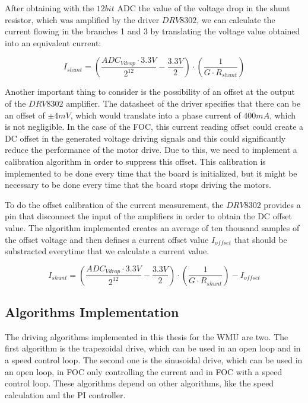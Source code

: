 After obtaining with the $12bit$ \ac{ADC} the value of the voltage drop in the shunt resistor, which was amplified by the driver $DRV8302$, we can calculate the current flowing in the branches 1 and 3 by translating the voltage value obtained into an equivalent current:

\begin{equation}
	I_{shunt} = (\frac{ ADC_{Vdrop} \cdot 3.3V }{ 2^{12} } - \frac{3.3V}{2}) \cdot (\frac{1}{G \cdot R_{shunt}})
\end{equation}

Another important thing to consider is the possibility of an offset at the output of the $DRV8302$ amplifier. The datasheet of the driver specifies that there can be an offset of $\pm 4mV$, which would translate into a phase current of $400mA$, which is not negligible. In the case of the \ac{FOC}, this current reading offset could create a \ac{DC} offset in the generated voltage driving signals and this could significantly reduce the performance of the motor drive. Due to this, we need to implement a calibration algorithm in order to suppress this offset. This calibration is implemented to be done every time that the board is initialized, but it might be necessary to be done every time that the board stops driving the motors.

To do the offset calibration of the current measurement, the $DRV8302$ provides a pin that disconnect the input of the amplifiers in order to obtain the \ac{DC} offset value. The algorithm implemented creates an average of ten thousand samples of the offset voltage and then defines a current offset value $I_{offset}$ that should be substracted everytime that we calculate a current value.

\begin{equation}
	I_{shunt} = (\frac{ ADC_{Vdrop} \cdot 3.3V }{ 2^{12} } - \frac{3.3V}{2}) \cdot (\frac{1}{G \cdot R_{shunt}}) - I_{offset}
\end{equation}

\subsection{Algorithms Implementation}

The driving algorithms implemented in this thesis for the \ac{WMU} are two. The first algorithm is the trapezoidal drive, which can be used in an open loop and in a speed control loop. The second one is the sinusoidal drive, which can be used in an open loop, in \ac{FOC} only controlling the current and in \ac{FOC} with a speed control loop. These algorithms depend on other algorithms, like the speed calculation and the \ac{PI} controller.

